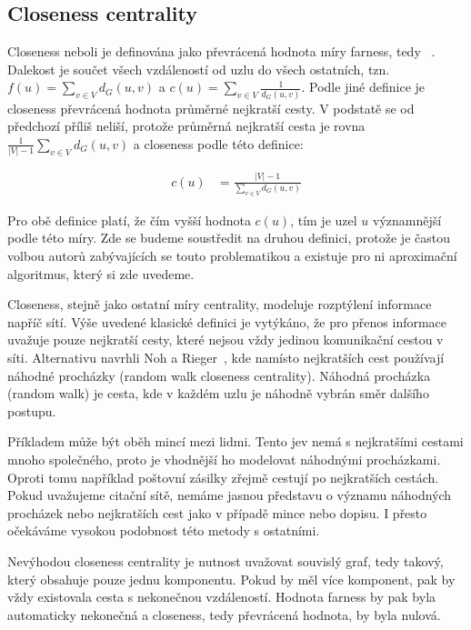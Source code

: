 \documentclass{bakalarka}
\begin{document}
\subsection{Closeness centrality}
Closeness neboli  je definována jako převrácená hodnota míry
farness, tedy ~\citep{sabidussi1966}. Dalekost je součet všech
vzdáleností od uzlu do všech ostatních, tzn. $f(u) = \sum_{v \in V} d_G(u, v)$
a $c(u) = \sum_{v \in V} \frac{1}{d_G(u, v)}$. Podle jiné definice je closeness
převrácená hodnota průměrné nejkratší cesty. V podstatě se od předchozí příliš
neliší, protože průměrná nejkratší cesta je rovna $\frac{1}{|V|
- 1} \sum_{v \in V} d_G(u, v)$ a closeness podle této definice:

\begin{align*}
c(u) &= \frac{|V| - 1}{\sum_{v \in V} d_G(u, v)}
\end{align*}

Pro obě definice platí, že čím vyšší hodnota $c(u)$, tím je uzel $u$
významnější podle této míry. Zde se budeme soustředit na druhou definici,
protože je častou volbou autorů zabývajících se touto problematikou a existuje
pro ni aproximační algoritmus, který si zde uvedeme.

Closeness, stejně jako ostatní míry centrality, modeluje rozptýlení informace
napříč sítí. Výše uvedené klasické definici je vytýkáno, že pro přenos
informace uvažuje pouze nejkratší cesty, které nejsou vždy jedinou komunikační
cestou v síti. Alternativu navrhli Noh a Rieger~\citep{nohrieger2004}, kde
namísto nejkratších cest používají náhodné procházky (random walk closeness
centrality). Náhodná procházka (random walk) je cesta, kde v každém uzlu je
náhodně vybrán směr dalšího postupu.

Příkladem může být oběh mincí mezi lidmi. Tento jev nemá s nejkratšími cestami
mnoho společného, proto je vhodnější ho modelovat náhodnými procházkami. Oproti
tomu například poštovní zásilky zřejmě cestují po nejkratších cestách. Pokud
uvažujeme citační sítě, nemáme jasnou představu o významu náhodných procházek
nebo nejkratších cest jako v případě mince nebo dopisu. I přesto očekáváme
vysokou podobnost této metody s ostatními.

Nevýhodou closeness centrality je nutnost uvažovat souvislý graf, tedy takový,
který obsahuje pouze jednu komponentu. Pokud by měl více komponent, pak by vždy
existovala cesta s nekonečnou vzdáleností. Hodnota farness by pak byla
automaticky nekonečná a closeness, tedy převrácená hodnota, by byla nulová. 
\end{document}
